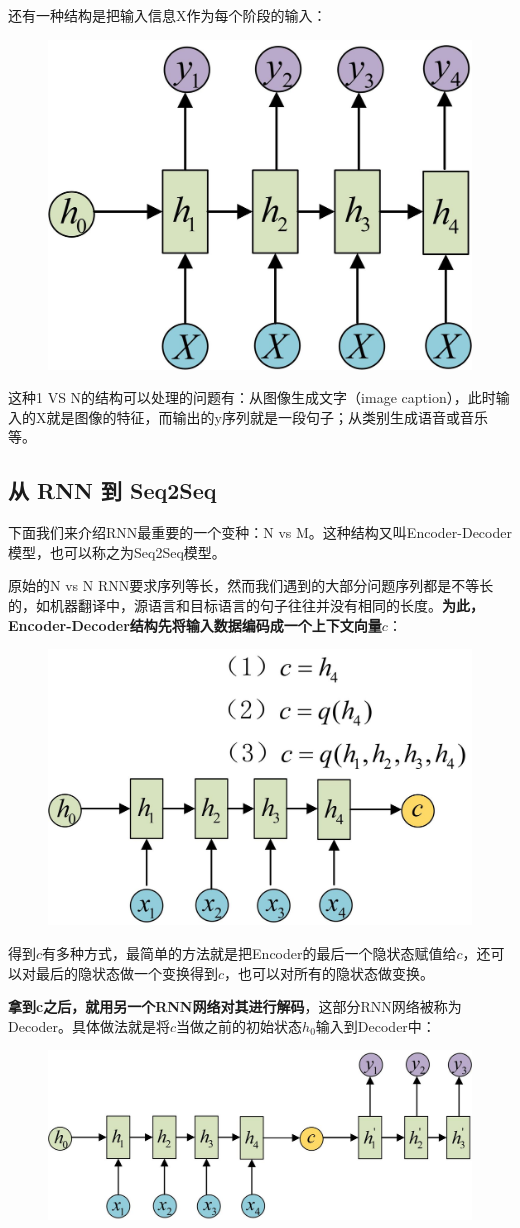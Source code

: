 \documentclass[12pt]{article}
\begin{document}
还有一种结构是把输入信息X作为每个阶段的输入：
\begin{figure}[H]
    \centering
    \includegraphics[width=.3\textwidth]{fig/RNN_Classic_Output_1_to_N_2.jpg}
\end{figure}

这种1 VS N的结构可以处理的问题有：从图像生成文字（image caption），此时输入的X就是图像的特征，而输出的y序列就是一段句子；从类别生成语音或音乐等。

\subsection{从 RNN 到 Seq2Seq}
下面我们来介绍RNN最重要的一个变种：N vs M。这种结构又叫Encoder-Decoder模型，也可以称之为Seq2Seq模型。

原始的N vs N RNN要求序列等长，然而我们遇到的大部分问题序列都是不等长的，如机器翻译中，源语言和目标语言的句子往往并没有相同的长度。\textbf{为此，Encoder-Decoder结构先将输入数据编码成一个上下文向量$c$}：
\begin{figure}[H]
    \centering
    \includegraphics[width=.5\textwidth]{fig/RNN_Classic_Output_N_to_M_c.jpg}
\end{figure}

得到$c$有多种方式，最简单的方法就是把Encoder的最后一个隐状态赋值给$c$，还可以对最后的隐状态做一个变换得到$c$，也可以对所有的隐状态做变换。

\textbf{拿到c之后，就用另一个RNN网络对其进行解码}，这部分RNN网络被称为Decoder。具体做法就是将$c$当做之前的初始状态$h_0$输入到Decoder中：
\begin{figure}[H]
    \centering
    \includegraphics[width=.5\textwidth]{fig/RNN_Classic_Output_Encoder_Decoder.jpg}
\end{figure}
\end{document}
